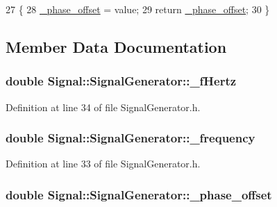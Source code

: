\begin{DoxyCode}
27                                                                    \{
28     \hyperlink{classSignal_1_1SignalGenerator_a6b4444d46747c8517171edbbf4b5588f}{\_phase\_offset} = value;
29     \textcolor{keywordflow}{return} \hyperlink{classSignal_1_1SignalGenerator_a6b4444d46747c8517171edbbf4b5588f}{\_phase\_offset};
30 \}
\end{DoxyCode}


\subsection{Member Data Documentation}
\hypertarget{classSignal_1_1SignalGenerator_a85a4702347352bab1c71e0a8df8437d6}{
\subsubsection[{\+\_\+f\+Hertz}]{\setlength{\rightskip}{0pt plus 5cm}double Signal\+::\+Signal\+Generator\+::\+\_\+f\+Hertz\hspace{0.3cm}{\ttfamily [protected]}}}\label{classSignal_1_1SignalGenerator_a85a4702347352bab1c71e0a8df8437d6}


Definition at line 34 of file Signal\+Generator.\+h.

\hypertarget{classSignal_1_1SignalGenerator_a7f107461333bce68c5dad412db96a8c2}{
\subsubsection[{\+\_\+frequency}]{\setlength{\rightskip}{0pt plus 5cm}double Signal\+::\+Signal\+Generator\+::\+\_\+frequency\hspace{0.3cm}{\ttfamily [protected]}}}\label{classSignal_1_1SignalGenerator_a7f107461333bce68c5dad412db96a8c2}


Definition at line 33 of file Signal\+Generator.\+h.

\hypertarget{classSignal_1_1SignalGenerator_a6b4444d46747c8517171edbbf4b5588f}{
\subsubsection[{\+\_\+phase\+\_\+offset}]{\setlength{\rightskip}{0pt plus 5cm}double Signal\+::\+Signal\+Generator\+::\+\_\+phase\+\_\+offset\hspace{0.3cm}{\ttfamily [protected]}}}\label{classSignal_1_1SignalGenerator_a6b4444d46747c8517171edbbf4b5588f}


